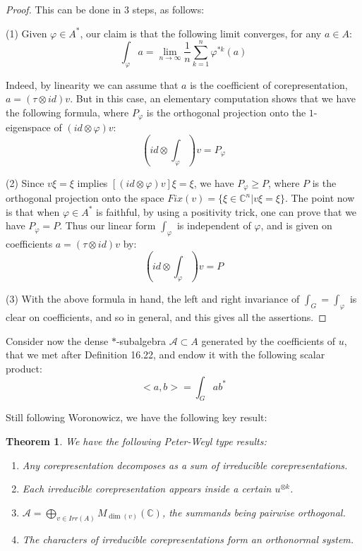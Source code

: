 \documentclass[12pt]{amsbook}
\newtheorem{theorem}{Theorem}[chapter]
\begin{document}
\begin{proof}
This can be done in 3 steps, as follows:

\medskip

(1) Given $\varphi\in A^*$, our claim is that the following limit converges, for any $a\in A$:
$$\int_\varphi a=\lim_{n\to\infty}\frac{1}{n}\sum_{k=1}^n\varphi^{*k}(a)$$

Indeed, by linearity we can assume that $a$ is the coefficient of corepresentation, $a=(\tau\otimes id)v$. But in this case, an elementary computation shows that we have the following formula, where $P_\varphi$ is the orthogonal projection onto the $1$-eigenspace of $(id\otimes\varphi)v$:
$$\left(id\otimes\int_\varphi\right)v=P_\varphi$$

(2) Since $v\xi=\xi$ implies $[(id\otimes\varphi)v]\xi=\xi$, we have $P_\varphi\geq P$, where $P$ is the orthogonal projection onto the space $Fix(v)=\{\xi\in\mathbb C^n|v\xi=\xi\}$. The point now is that when $\varphi\in A^*$ is faithful, by using a positivity trick, one can prove that we have $P_\varphi=P$. Thus our linear form $\int_\varphi$ is independent of $\varphi$, and is given on coefficients $a=(\tau\otimes id)v$ by:
$$\left(id\otimes\int_\varphi\right)v=P$$

(3) With the above formula in hand, the left and right invariance of $\int_G=\int_\varphi$ is clear on coefficients, and so in general, and this gives all the assertions.
\end{proof}

Consider now the dense $*$-subalgebra $\mathcal A\subset A$ generated by the coefficients of $u$, that we met after Definition 16.22, and endow it with the following scalar product:
$$<a,b>=\int_Gab^*$$

Still following Woronowicz, we have the following key result:

\begin{theorem}
We have the following Peter-Weyl type results:
\begin{enumerate}
\item Any corepresentation decomposes as a sum of irreducible corepresentations.

\item Each irreducible corepresentation appears inside a certain $u^{\otimes k}$.

\item $\mathcal A=\bigoplus_{v\in Irr(A)}M_{\dim(v)}(\mathbb C)$, the summands being pairwise orthogonal.

\item The characters of irreducible corepresentations form an orthonormal system.
\end{enumerate}
\end{theorem}
\end{document}
